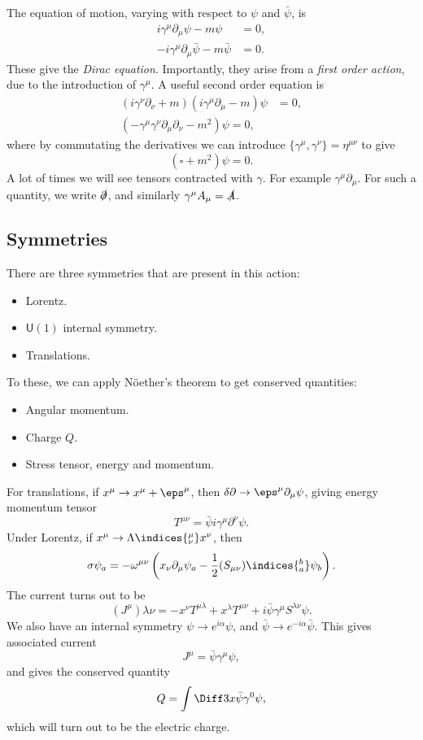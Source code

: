 \documentclass[12pt]{article}
\begin{document}
The equation of motion, varying with respect to $\psi$ and $\bar \psi$, is
\begin{align*}
	i \gamma^\mu \partial_\mu \psi - m \psi &= 0,\\
	-i \gamma^\mu \partial_\mu \bar \psi - m \bar \psi &= 0.
\end{align*}
These give the \emph{Dirac equation}. Importantly, they arise from a \emph{first order action}, due to the introduction of $\gamma^\mu$. A useful second order equation is
\begin{align*}
	(i \gamma^\nu \partial_\nu + m)(i \gamma^\mu \partial_\mu - m) \psi &= 0, \\
	(- \gamma^\mu \gamma^\nu \partial_\mu \partial_\nu - m^2) \psi = 0,
\end{align*}
where by commutating the derivatives we can introduce $\{\gamma^\mu, \gamma^\nu\} = \eta^{\mu\nu}$ to give
\[
	(\square + m^2)\psi = 0.
\]
A lot of times we will see tensors contracted with $\gamma$. For example $\gamma^\mu \partial_\mu$. For such a quantity, we write $\slashed{\partial}$, and similarly $\gamma^\mu A_\mu = \slashed{A}$.

\subsection{Symmetries}%
\label{sub:spin_sym}

There are three symmetries that are present in this action:
\begin{itemize}
	\item Lorentz.
	\item $\mathsf{U}(1)$ internal symmetry.
	\item Translations.
\end{itemize}
To these, we can apply N\"oether's theorem to get conserved quantities:
\begin{itemize}
	\item Angular momentum.
	\item Charge $Q$.
	\item Stress tensor, energy and momentum.
\end{itemize}
For translations, if $x^\mu \to x^\mu + \eps ^\mu$, then $\delta \partial \to \eps^\mu \partial_\mu \psi$, giving energy momentum tensor
\[
T^{\mu\nu} = \bar \psi i \gamma^\mu \partial^\nu \psi.
\]
Under Lorentz, if $x^\mu \to \Lambda\indices{^{\mu}_{\nu}} x^\nu$, then
\[
\sigma \psi_a = - \omega^{\mu\nu} \left(x_\nu \partial_\mu \psi_a - \frac 12 (S_{\mu\nu})\indices{^{b}_{a}} \psi_b \right).
\]
The current turns out to be
\[
	(J^{\mu})\lambda\nu = - x^{\nu} T^{\mu\lambda} + x^{\lambda} T^{\mu\nu} + i \bar \psi \gamma^\mu S^{\lambda\nu} \psi.
\]
We also have an internal symmetry $\psi \to e^{i \alpha} \psi$, and $\bar \psi \to e^{-i\alpha} \bar \psi$. This gives associated current
\[
J^\mu = \bar \psi \gamma^\mu \psi,
\]
and gives the conserved quantity
\[
Q = \int \Diff 3 x \bar \psi \gamma^0 \psi,
\]
which will turn out to be the electric charge.
\end{document}
